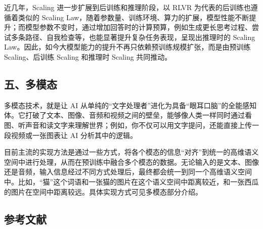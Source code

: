 近几年，Scaling 进一步扩展到后训练和推理阶段，以 RLVR 为代表的后训练也遵循着类似的 Scaling Law，随着参数量、训练环境、算力的扩展，模型性能不断提升；而模型参数不变时，通过增加回答时的计算预算，例如生成更长思考过程、尝试多条路径、自我检查等，也能显著提升复杂任务表现，呈现出推理时的 Scaling Law。因此，如今大模型能力的提升不再只依赖预训练规模扩张，而是由预训练 Scaling、后训练 Scaling 和推理时 Scaling 共同推动。

\hypertarget{ux4e94ux591aux6a21ux6001}{%
\subsection{五、多模态}\label{ux4e94ux591aux6a21ux6001}}

多模态技术，就是让 AI 从单纯的``文字处理者''进化为具备``眼耳口脑''的全能感知体。它打破了文本、图像、音频和视频之间的壁垒，能够像人类一样同时通过看图、听声音和读文字来理解世界；例如，你不仅可以用文字提问，还能直接上传一段视频或一张图表让 AI 分析其中的逻辑。

目前主流的实现方法是通过一些方式，将各个模态的信息``对齐''到统一的高维语义空间中进行处理，从而在预训练中融合多个模态的数据。无论输入的是文本、图像还是音频，输入信息经过不同方式处理后，最终都会统一到同一个高维语义空间中。比如，``猫''这个词语和一张猫的图片在这个语义空间中距离较近，和一张西瓜的图片在空间中距离较远。具体实现方式可见多模态部分介绍。

\hypertarget{ux53c2ux8003ux6587ux732e-73}{%
\subsection{参考文献}\label{ux53c2ux8003ux6587ux732e-73}}

